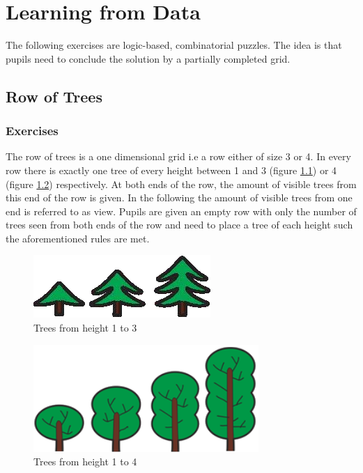 \chapter{Learning from Data}
\label{chapter:learningFromData}

The following exercises are logic-based, combinatorial puzzles. The idea is that pupils need to conclude the solution by a partially completed grid.

\section{Row of Trees}
\label{section:treeRow}

\subsection{Exercises}
The row of trees is a one dimensional grid i.e a row either of size 3 or 4. In every row there is exactly one tree of every height between 1 and 3 (figure \ref{fig:trees_3}) or 4 (figure \ref{fig:trees_4}) respectively. At both ends of the row, the amount of visible trees from this end of the row is given. In the following the amount of visible trees from one end is referred to as view.
Pupils are given an empty row with only the number of trees seen from both ends of the row and need to place a tree of each height such the aforementioned rules are met.

\begin{figure} 
    \centering
    \includegraphics[width=0.4 \columnwidth]{figures/trees_3.png}
    \caption{Trees from height 1 to 3} 
    \label{fig:trees_3} 
\end{figure}

\begin{figure} 
    \centering
    \includegraphics[width=0.4 \columnwidth]{figures/trees_4.png}
    \caption{Trees from height 1 to 4} 
    \label{fig:trees_4} 
\end{figure}

